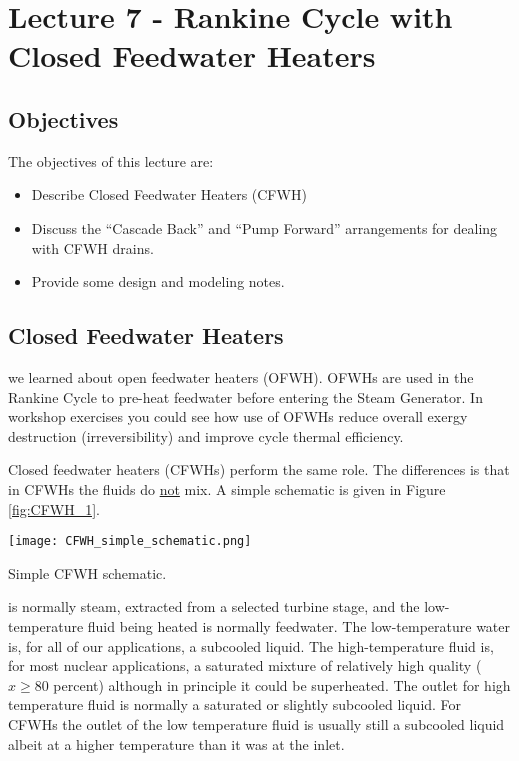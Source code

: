 \chapter{Lecture 7 - Rankine Cycle with Closed Feedwater Heaters}
\label{ch:ch7}
\section{Objectives}
The objectives of this lecture are:
\begin{itemize}
\item Describe Closed Feedwater Heaters (CFWH)
\item Discuss the ``Cascade Back'' and ``Pump Forward'' arrangements for dealing with CFWH drains.
\item Provide some design and modeling notes.
\end{itemize}

\section{Closed Feedwater Heaters}
 we learned about open feedwater heaters (OFWH).  OFWHs are used in the Rankine Cycle to pre-heat feedwater before entering the Steam Generator.  In workshop exercises you could see how use of OFWHs reduce overall exergy destruction (irreversibility) and improve cycle thermal efficiency.  

Closed feedwater heaters (CFWHs) perform the same role.  The differences is that in CFWHs the fluids do \underline{not} mix.  A simple schematic is given in Figure \ref{fig:CFWH_1}.
\begin{marginfigure}
\texttt{[image: CFWH\_simple\_schematic.png]}
\caption{Simple CFWH schematic.}
\label{fig:CFWH_1}
\end{marginfigure}
 is normally steam, extracted from a selected turbine stage, and the low-temperature fluid being heated is normally feedwater.  The low-temperature water is, for all of our applications, a subcooled liquid.  The high-temperature fluid is, for most nuclear applications, a saturated mixture of relatively high quality ($x \ge 80$ percent) although in principle it could be superheated.  The outlet for high temperature fluid is normally a saturated or slightly subcooled liquid. For CFWHs the outlet of the low temperature fluid is usually still a subcooled liquid albeit at a higher temperature than it was at the inlet. 

